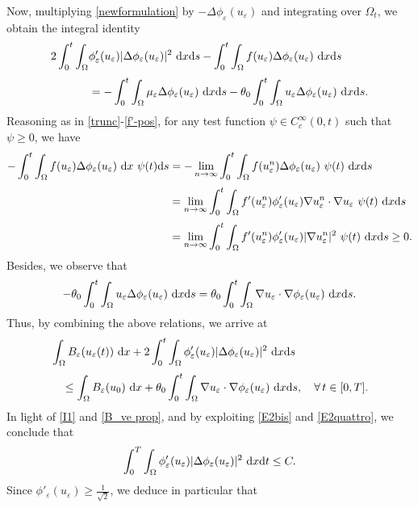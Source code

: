 \documentclass[11pt,  reqno]{amsart}%
\theoremstyle{plain}
\theoremstyle{definition}
\theoremstyle{remark}
\numberwithin{equation}{section}
\newcommand{\ve}{\varepsilon}
\newcommand{\dx}{\textup{d}x}
\newcommand{\dt}{\textup{d}t}
\newcommand{\ds}{\textup{d}s}
\begin{document}
Now, multiplying \eqref{newformulation} by $-\Delta \phi_\ve(u_\ve)$ and integrating over $\Omega_t$, we obtain the integral identity
\begin{align} 
		2 \int_0^t \int_\Omega &\phi_\ve'(u_\ve) |\Delta \phi_\ve(u_\ve)|^2 \ \dx\ds - \int_0^t \int_\Omega f(u_\ve) \Delta \phi_\ve(u_\ve) \  \dx \ds \notag \\[3pt]
		&= - \int_0^t \int_\Omega  \mu_\ve  \Delta \phi_\ve(u_\ve) \ \dx \ds
		- \theta_0 \int_0^t \int_\Omega  u_\ve \Delta \phi_\ve(u_\ve) \ \dx\ds.
\label{SE 1-new}
\end{align}
Reasoning as in \eqref{trunc}-\eqref{f'-pos}, for any test function $\psi\in C^\infty_c(0,t)$ such that $\psi \geq 0$,
we have
\begin{align*}
- \int_0^t \int_\Omega f(u_\ve) \Delta \phi_\ve(u_\ve) \  \dx \ \psi(t)  \ds
\notag
&=
- \lim_{n \to \infty} \int_0^t  \int_\Omega f(u_\ve^n) \Delta \phi_\ve(u_\ve) \ \psi(t) \ \dx \ds
\notag 
\\[3pt]
&=\lim_{n \to \infty}  \int_0^t \int_\Omega f'(u_\ve^n) \phi'_\ve(u_\ve) \nabla u_\ve^n \cdot \nabla u_\ve \ \psi(t) \ \dx\ds
\notag
\\[3pt]
& =\lim_{n \to \infty}  \int_0^t  \int_\Omega  f'(u_\ve^n) \phi'_\ve(u_\ve) |\nabla u_\ve^n|^2 \ \psi(t) \ \dx \ds \geq 0.
\end{align*}
Besides, we observe that
\begin{align*}
- \theta_0 \int_0^t \int_\Omega u_\ve \Delta \phi_\ve(u_\ve) \ \dx\ds
= \theta_0 \int_0^t \int_\Omega  \nabla u_\ve \cdot \nabla \phi_\ve(u_\ve) \ \dx\ds.
\end{align*}
Thus, by combining the above relations, we arrive at
\begin{align}
&\int_\Omega B_\ve (u_\ve(t)) \ \dx 
+ 2 \int_0^t \int_\Omega \phi_\ve'(u_\ve) |\Delta \phi_\ve(u_\ve)|^2 \ \dx\ds
\notag
\\[3pt]
&\quad \leq \int_\Omega B_\ve (u_0) \ \dx +
  \theta_0 \int_0^t \int_\Omega  \nabla u_\ve \cdot \nabla \phi_\ve(u_\ve) \ \dx\ds, \quad \forall \, t \in [0,T].
\end{align}
In light of \eqref{I1} and \eqref{B_ve prop}, and by exploiting \eqref{E2bis} and \eqref{E2quattro}, we conclude that
\begin{equation}
\label{NEW-deltaphi}
\int_0^T \int_\Omega \phi_\ve'(u_\ve) |\Delta \phi_\ve(u_\ve)|^2 \ \dx\dt \leq C.
\end{equation}  
Since $\phi'_\ve(u_\ve)\geq \frac{1}{\sqrt{2}}$, we deduce in particular that
\end{document}
